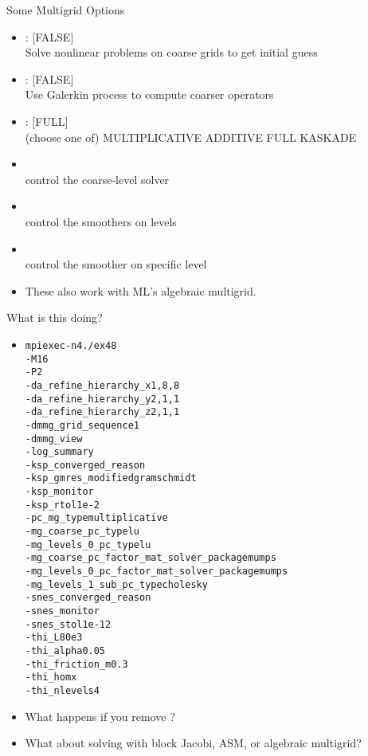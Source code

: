 


\begin{frame}{Some Multigrid Options}
  \begin{itemize}
  \item {}: [FALSE] \\
    Solve nonlinear problems on coarse grids to get initial guess
  \item {}: [FALSE] \\
    Use Galerkin process to compute coarser operators
  \item {}: [FULL] \\
    (choose one of) MULTIPLICATIVE ADDITIVE FULL KASKADE
  \item {} \\
    control the coarse-level solver
  \item {} \\
    control the smoothers on levels
  \item {} \\
    control the smoother on specific level
  \item These also work with ML's algebraic multigrid.
  \end{itemize}
\end{frame}

\begin{frame}{What is this doing?}
\begin{itemize}
\item
\begin{alltt}\footnotesize
mpiexec -n 4 ./ex48
-M 16
-P 2
-da\_refine\_hierarchy\_x 1,8,8 \\
-da\_refine\_hierarchy\_y 2,1,1
-da\_refine\_hierarchy\_z 2,1,1 \\
-dmmg\_grid\_sequence 1
-dmmg\_view
-log\_summary \\
-ksp\_converged\_reason
-ksp\_gmres\_modifiedgramschmidt \\
-ksp\_monitor
-ksp\_rtol 1e-2 \\
-pc\_mg\_type multiplicative \\
-mg\_coarse\_pc\_type lu
-mg\_levels\_0\_pc\_type lu \\
-mg\_coarse\_pc\_factor\_mat\_solver\_package mumps \\
-mg\_levels\_0\_pc\_factor\_mat\_solver\_package mumps \\
-mg\_levels\_1\_sub\_pc\_type cholesky \\
-snes\_converged\_reason
-snes\_monitor
-snes\_stol 1e-12 \\
-thi\_L 80e3
-thi\_alpha 0.05
-thi\_friction\_m 0.3 \\
-thi\_hom x
-thi\_nlevels 4
\end{alltt}
\item What happens if you remove ?
\item What about solving with block Jacobi, ASM, or algebraic multigrid?
\end{itemize}
\end{frame}
